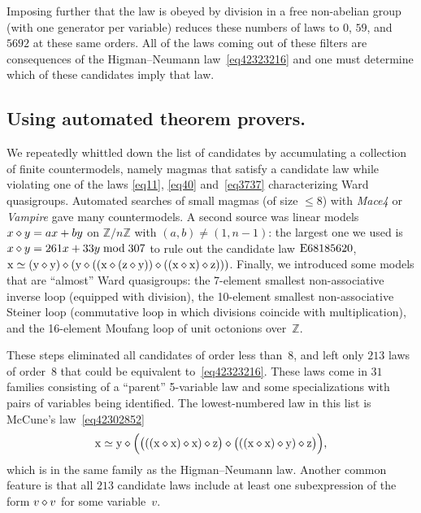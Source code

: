 Imposing further that the law is obeyed by division in a free non-abelian group (with one generator per variable) reduces these numbers of laws to $0$, $59$, and $\num{5692}$ at these same orders.  All of the laws coming out of these filters are consequences of the Higman--Neumann law~\eqref{eq42323216} and one must determine which of these candidates imply that law.

\subsection{Using automated theorem provers.}

We repeatedly whittled down the list of candidates by accumulating a collection of finite countermodels, namely magmas that satisfy a candidate law while violating one of the laws \eqref{eq11}, \eqref{eq40} and~\eqref{eq3737} characterizing Ward quasigroups.  Automated searches of small magmas (of size $\leq 8$) with \emph{Mace4} or \emph{Vampire} gave many countermodels.  A second source was linear models $x \diamond y = ax+by$ on $\mathbb{Z}/n\mathbb{Z}$ with $(a,b)\neq(1,n-1)$: the largest one we used is $x \diamond y = 261x + 33y \bmod 307$ to rule out the candidate law $\mathrm{E}68185620$, $\mathrm{x} \simeq (\mathrm{y} \diamond \mathrm{y}) \diamond (\mathrm{y} \diamond ((\mathrm{x} \diamond (\mathrm{z} \diamond \mathrm{y})) \diamond ((\mathrm{x} \diamond \mathrm{x}) \diamond \mathrm{z})))$.  Finally, we introduced some models that are ``almost'' Ward quasigroups: the 7-element smallest non-associative inverse loop (equipped with division), the 10-element smallest non-associative Steiner loop (commutative loop in which divisions coincide with multiplication), and the 16-element Moufang loop of unit octonions over~$\mathbb{Z}$.

These steps eliminated all candidates of order less than~$8$, and left only $213$ laws of order~$8$ that could be equivalent to~\eqref{eq42323216}.  These laws come in $31$ families consisting of a ``parent'' 5-variable law and some specializations with pairs of variables being identified.  The lowest-numbered law in this list is McCune's law~\eqref{eq42302852}
\[
\mathrm{x} \simeq \mathrm{y} \diamond \Bigl(\bigl(((\mathrm{x} \diamond \mathrm{x}) \diamond \mathrm{x}) \diamond \mathrm{z}\bigr) \diamond \bigl(((\mathrm{x} \diamond \mathrm{x}) \diamond \mathrm{y}) \diamond \mathrm{z}\bigr)\Bigr) ,
\]
which is in the same family as the Higman--Neumann law.  Another common feature is that all $213$ candidate laws include at least one subexpression of the form $v \diamond v$ for some variable~$v$.

